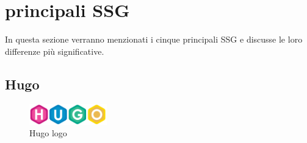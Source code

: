\documentclass[target=bach,aauheader=]{thud}
\begin{document}
\section{principali SSG}
In questa sezione verranno menzionati i cinque principali SSG e discusse le loro differenze più significative. 

\subsection{Hugo}\label{subsec:shugo}
\begin{figure}
    \centering
    \includegraphics[width = 0.3\textwidth]{images/Hugo_logo.png}
    \caption{Hugo logo}
\end{figure}
\end{document}
